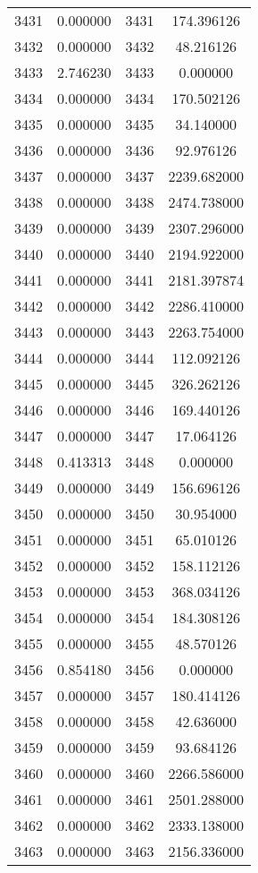 \documentclass[12pt]{article}
\begin{document}
\begin{longtable}{@{}cccc@{}}
3431 & 0.000000 & 3431 & 174.396126 \\
3432 & 0.000000 & 3432 & 48.216126 \\
3433 & 2.746230 & 3433 & 0.000000 \\
3434 & 0.000000 & 3434 & 170.502126 \\
3435 & 0.000000 & 3435 & 34.140000 \\
3436 & 0.000000 & 3436 & 92.976126 \\
3437 & 0.000000 & 3437 & 2239.682000 \\
3438 & 0.000000 & 3438 & 2474.738000 \\
3439 & 0.000000 & 3439 & 2307.296000 \\
3440 & 0.000000 & 3440 & 2194.922000 \\
3441 & 0.000000 & 3441 & 2181.397874 \\
3442 & 0.000000 & 3442 & 2286.410000 \\
3443 & 0.000000 & 3443 & 2263.754000 \\
3444 & 0.000000 & 3444 & 112.092126 \\
3445 & 0.000000 & 3445 & 326.262126 \\
3446 & 0.000000 & 3446 & 169.440126 \\
3447 & 0.000000 & 3447 & 17.064126 \\
3448 & 0.413313 & 3448 & 0.000000 \\
3449 & 0.000000 & 3449 & 156.696126 \\
3450 & 0.000000 & 3450 & 30.954000 \\
3451 & 0.000000 & 3451 & 65.010126 \\
3452 & 0.000000 & 3452 & 158.112126 \\
3453 & 0.000000 & 3453 & 368.034126 \\
3454 & 0.000000 & 3454 & 184.308126 \\
3455 & 0.000000 & 3455 & 48.570126 \\
3456 & 0.854180 & 3456 & 0.000000 \\
3457 & 0.000000 & 3457 & 180.414126 \\
3458 & 0.000000 & 3458 & 42.636000 \\
3459 & 0.000000 & 3459 & 93.684126 \\
3460 & 0.000000 & 3460 & 2266.586000 \\
3461 & 0.000000 & 3461 & 2501.288000 \\
3462 & 0.000000 & 3462 & 2333.138000 \\
3463 & 0.000000 & 3463 & 2156.336000 \\

\end{longtable}
\end{document}
